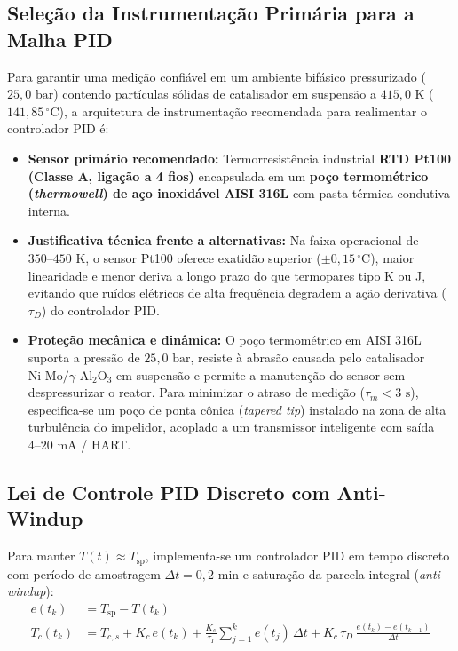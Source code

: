 \documentclass[11pt, a4paper]{article}
\begin{document}
\subsection{Seleção da Instrumentação Primária para a Malha PID}
Para garantir uma medição confiável em um ambiente bifásico pressurizado ($25{,}0\text{ bar}$) contendo partículas sólidas de catalisador em suspensão a $415{,}0\text{ K}$ ($141{,}85\,^\circ\text{C}$), a arquitetura de instrumentação recomendada para realimentar o controlador PID é:
\begin{itemize}
  \item \textbf{Sensor primário recomendado:} Termorresistência industrial \textbf{RTD Pt100 (Classe A, ligação a 4 fios)} encapsulada em um \textbf{poço termométrico (\textit{thermowell}) de aço inoxidável AISI 316L} com pasta térmica condutiva interna.
  \item \textbf{Justificativa técnica frente a alternativas:} Na faixa operacional de $350\text{--}450\text{ K}$, o sensor Pt100 oferece exatidão superior ($\pm 0{,}15\,^\circ\text{C}$), maior linearidade e menor deriva a longo prazo do que termopares tipo K ou J, evitando que ruídos elétricos de alta frequência degradem a ação derivativa ($\tau_D$) do controlador PID.
  \item \textbf{Proteção mecânica e dinâmica:} O poço termométrico em AISI 316L suporta a pressão de $25{,}0\text{ bar}$, resiste à abrasão causada pelo catalisador $\text{Ni-Mo}/\gamma\text{-Al}_2\text{O}_3$ em suspensão e permite a manutenção do sensor sem despressurizar o reator. Para minimizar o atraso de medição ($\tau_m < 3\text{ s}$), especifica-se um poço de ponta cônica (\textit{tapered tip}) instalado na zona de alta turbulência do impelidor, acoplado a um transmissor inteligente com saída $4\text{--}20\text{ mA}$ / HART.
\end{itemize}

\subsection{Lei de Controle PID Discreto com Anti-Windup}
Para manter $T(t) \approx T_{\text{sp}}$, implementa-se um controlador PID em tempo discreto com período de amostragem $\Delta t = 0{,}2\text{ min}$ e saturação da parcela integral (\textit{anti-windup}):
\begin{align}
  e(t_k) &= T_{\text{sp}} - T(t_k) \\[4pt]
  T_c(t_k) &= T_{c,s} + K_c \, e(t_k) + \frac{K_c}{\tau_I} \sum_{j=1}^{k} e(t_j)\,\Delta t + K_c\,\tau_D\,\frac{e(t_k) - e(t_{k-1})}{\Delta t}
\end{align}
\end{document}
